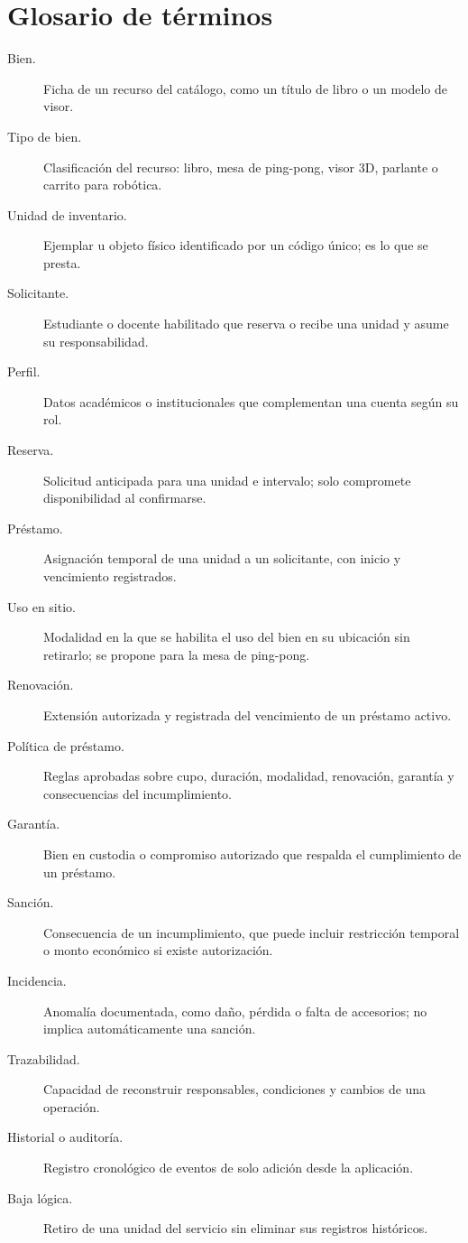 \chapter{Glosario de t\'erminos}

\begin{description}
    \item[Bien.] Ficha de un recurso del cat\'alogo, como un t\'itulo de libro o un modelo de visor.
    \item[Tipo de bien.] Clasificaci\'on del recurso: libro, mesa de ping-pong, visor 3D, parlante o carrito para rob\'otica.
    \item[Unidad de inventario.] Ejemplar u objeto f\'isico identificado por un c\'odigo \'unico; es lo que se presta.
    \item[Solicitante.] Estudiante o docente habilitado que reserva o recibe una unidad y asume su responsabilidad.
    \item[Perfil.] Datos acad\'emicos o institucionales que complementan una cuenta seg\'un su rol.
    \item[Reserva.] Solicitud anticipada para una unidad e intervalo; solo compromete disponibilidad al confirmarse.
    \item[Pr\'estamo.] Asignaci\'on temporal de una unidad a un solicitante, con inicio y vencimiento registrados.
    \item[Uso en sitio.] Modalidad en la que se habilita el uso del bien en su ubicaci\'on sin retirarlo; se propone para la mesa de ping-pong.
    \item[Renovaci\'on.] Extensi\'on autorizada y registrada del vencimiento de un pr\'estamo activo.
    \item[Pol\'itica de pr\'estamo.] Reglas aprobadas sobre cupo, duraci\'on, modalidad, renovaci\'on, garant\'ia y consecuencias del incumplimiento.
    \item[Garant\'ia.] Bien en custodia o compromiso autorizado que respalda el cumplimiento de un pr\'estamo.
    \item[Sanci\'on.] Consecuencia de un incumplimiento, que puede incluir restricci\'on temporal o monto econ\'omico si existe autorizaci\'on.
    \item[Incidencia.] Anomal\'ia documentada, como da\~no, p\'erdida o falta de accesorios; no implica autom\'aticamente una sanci\'on.
    \item[Trazabilidad.] Capacidad de reconstruir responsables, condiciones y cambios de una operaci\'on.
    \item[Historial o auditor\'ia.] Registro cronol\'ogico de eventos de solo adici\'on desde la aplicaci\'on.
    \item[Baja l\'ogica.] Retiro de una unidad del servicio sin eliminar sus registros hist\'oricos.
\end{description}
